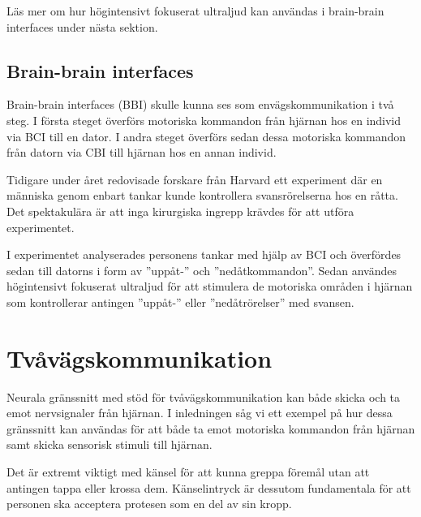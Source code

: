\documentclass[12pt, a4paper]{article}
\begin{document}
Läs mer om hur högintensivt fokuserat ultraljud kan användas i brain-brain
interfaces under nästa sektion.

\subsection{Brain-brain interfaces}

Brain-brain interfaces (BBI) skulle kunna ses som envägskommunikation i två
steg. I första steget överförs motoriska kommandon från hjärnan hos en individ
via BCI till en dator. I andra steget överförs sedan dessa motoriska kommandon
från datorn via CBI till hjärnan hos en annan individ.

Tidigare under året redovisade forskare från Harvard ett experiment där en
människa genom enbart tankar kunde kontrollera svansrörelserna hos en råtta. Det
spektakulära är att inga kirurgiska ingrepp krävdes för att utföra experimentet.

I experimentet analyserades personens tankar med hjälp av BCI och överfördes
sedan till datorns i form av ''uppåt-'' och ''nedåtkommandon''. Sedan användes
högintensivt fokuserat ultraljud för att stimulera de motoriska områden i
hjärnan som kontrollerar antingen ''uppåt-'' eller ''nedåtrörelser'' med svansen.
\cite{bbi}


\section{Tvåvägskommunikation}

Neurala gränssnitt med stöd för tvåvägskommunikation kan både skicka och ta emot
nervsignaler från hjärnan. I inledningen såg vi ett exempel på hur dessa
gränssnitt kan användas för att både ta emot motoriska kommandon från hjärnan
samt skicka sensorisk stimuli till hjärnan.

Det är extremt viktigt med känsel för att kunna greppa föremål utan att antingen
tappa eller krossa dem. Känselintryck är dessutom fundamentala för att personen
ska acceptera protesen som en del av sin kropp. \cite{prosthetic_operation}

\end{document}
